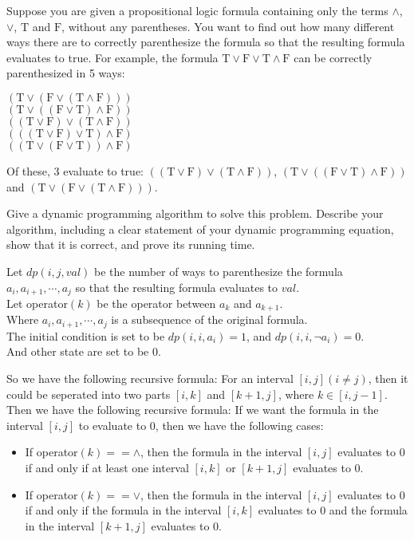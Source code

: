 \problem{}
Suppose you are given a propositional logic formula containing only the terms $\land$, $\lor$, $\text{T}$ and $\text{F}$, without any parentheses. You want to find out how many different ways there are to correctly parenthesize the formula so that the resulting formula evaluates to true. For example, the formula $\text{T} \lor \text{F} \lor \text{T} \land \text{F}$ can be correctly parenthesized in 5 ways:
\begin{center}
$(\text{T} \lor (\text{F} \lor (\text{T} \land \text{F})))$ \\
$(\text{T} \lor ((\text{F} \lor \text{T}) \land \text{F}))$ \\
$((\text{T} \lor \text{F}) \lor (\text{T} \land \text{F}))$ \\
$(((\text{T} \lor \text{F}) \lor \text{T}) \land \text{F})$ \\
$((\text{T} \lor (\text{F} \lor \text{T})) \land \text{F})$
\end{center}
Of these, 3 evaluate to true: $((\text{T} \lor \text{F}) \lor (\text{T} \land \text{F}))$, $(\text{T} \lor ((\text{F} \lor \text{T}) \land \text{F}))$ and $(\text{T} \lor (\text{F} \lor (\text{T} \land \text{F})))$.

Give a dynamic programming algorithm to solve this problem. Describe your algorithm, including a clear statement of your dynamic programming equation, show that it is correct, and prove its running time.

\solution{}

Let $dp(i,j,val)$ be the number of ways to parenthesize the formula $a_i,a_{i+1},\cdots,a_j$ so that the resulting formula evaluates to $val$.\\
Let operator$(k)$ be the operator between $a_k$ and $a_{k+1}$.\\
Where $a_i,a_{i+1},\cdots,a_j$ is a subsequence of the original formula.\\

The initial condition is set to be $dp(i,i,a_i)=1$, and $dp(i,i,\neg a_i)=0$.\\
And other state are set to be $0$.

So we have the following recursive formula:
For an interval $[i,j](i\neq j)$, then it could be seperated into two parts $[i,k]$ and $[k+1,j]$, where $k\in[i,j-1]$.\\
Then we have the following recursive formula:
If we want the formula in the interval $[i,j]$ to evaluate to $0$, then we have the following cases:
\begin{itemize}
    \item If operator$(k) == \land$, then the formula in the interval $[i,j]$ evaluates to $0$ if and only if at least one interval $[i,k]$ or $[k+1,j]$ evaluates to $0$.
    \item If operator$(k) == \lor$, then the formula in the interval $[i,j]$ evaluates to $0$ if and only if the formula in the interval $[i,k]$ evaluates to $0$ and the formula in the interval $[k+1,j]$ evaluates to $0$.
\end{itemize}


